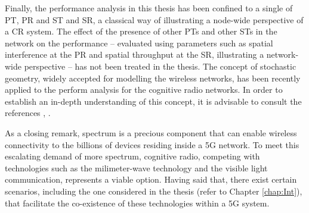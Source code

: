 Finally, the performance analysis in this thesis has been confined to a single of PT, PR and ST and SR, a classical way of illustrating a node-wide perspective of a CR system. The effect of the presence of other PTs and other STs in the network on the performance -- evaluated using parameters such as spatial interference at the PR and spatial throughput at the SR, illustrating a network-wide perspective -- has not been treated in the thesis. The concept of stochastic geometry, widely accepted for modelling the wireless networks, has been recently applied to the perform analysis for the cognitive radio networks. In order to establish an in-depth understanding of this concept, it is advisable to consult the references \cite{Ghasemi08, Lee12, Kusal12, Kusal13, Elsawy13, Song14}, . 

As a closing remark, spectrum is a precious component that can enable wireless connectivity to the billions of devices residing inside a 5G network. To meet this escalating demand of more spectrum, cognitive radio, competing with technologies such as the milimeter-wave technology and the visible light communication, represents a viable option. Having said that, there exist certain scenarios, including the one considered in the thesis (refer to Chapter \ref{chap:Int}), that facilitate the co-existence of these technologies within a 5G system. 








